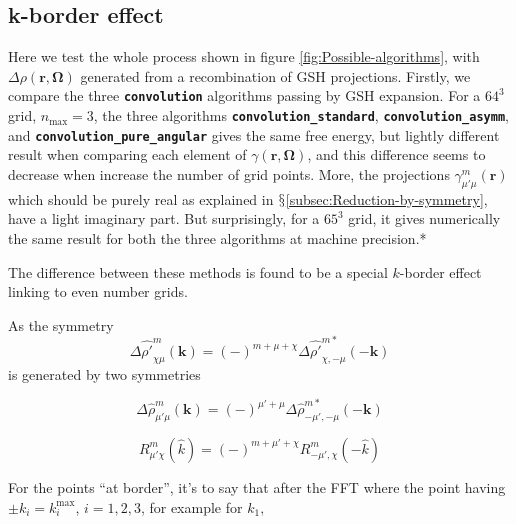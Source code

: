 \subsection{k-border effect\label{subsec:k-border-effect}}

Here we test the whole process shown in figure \ref{fig:Possible-algorithms},
with $\Delta\rho(\mathbf{r},\mathbf{\Omega})$ generated from a recombination
of \acs{GSH} projections. Firstly, we compare the three \texttt{\textbf{convolution}}
algorithms passing by \acs{GSH} expansion. For a $64^{3}$ grid,
$n_{\max}=3$, the three algorithms \texttt{\textbf{convolution\_standard}},
\texttt{\textbf{convolution\_asymm}}, and \texttt{\textbf{convolution\_pure\_angular}}
gives the same free energy, but lightly different result when comparing
each element of $\gamma(\mathbf{r},\mathbf{\Omega})$, and this difference
seems to decrease when increase the number of grid points. More, the
projections $\gamma_{\mu'\mu}^{m}(\mathbf{r})$ which should be purely
real as explained in $\mathsection$\ref{subsec:Reduction-by-symmetry},
have a light imaginary part. But surprisingly, for a $65^{3}$ grid,
it gives numerically the same result for both the three algorithms
at machine precision.{*} 

The difference between these methods is found to be a special $k$-border
effect linking to even number grids.

As the symmetry
\begin{equation}
\Delta\hat{\rho'}_{\chi\mu}^{m}(\mathbf{k})=(-)^{m+\mu+\chi}\Delta\hat{\rho'}_{\chi,-\mu}^{m*}(-\mathbf{k})\label{eq:2-1}
\end{equation}
 is generated by two symmetries

\begin{equation}
\Delta\hat{\rho}_{\mu'\mu}^{m}(\mathbf{k})=(-)^{\mu'+\mu}\Delta\hat{\rho}_{-\mu',-\mu}^{m*}(-\mathbf{k})\label{eq:1-1}
\end{equation}

\begin{equation}
R_{\mu'\chi}^{m}(\hat{k})=(-)^{m+\mu'+\chi}R_{-\mu',\chi}^{m}(-\hat{k})\label{eq:3-1}
\end{equation}

For the points ``at border'', it's to say that after the FFT where
the point having $\pm k_{i}=k_{i}^{\mathrm{max}}$, $i=1,2,3$, for
example for $k_{1},$

